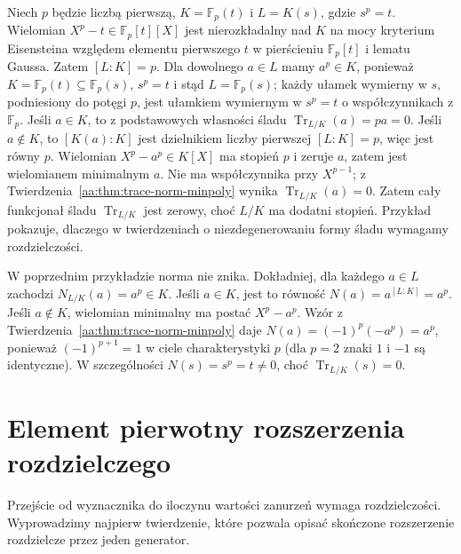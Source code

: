 \begin{przyklad}
\label{aa:ex:inseparable-trace}
Niech $p$ będzie liczbą pierwszą,
$K=\mathbb F_p(t)$ i $L=K(s)$, gdzie $s^p=t$.
Wielomian $X^p-t\in\mathbb F_p[t][X]$ jest
nierozkładalny nad $K$ na mocy kryterium Eisensteina
względem elementu pierwszego $t$ w pierścieniu
$\mathbb F_p[t]$ i lematu Gaussa.
Zatem $[L:K]=p$.
Dla dowolnego $a\in L$ mamy $a^p\in K$,
ponieważ $K=\mathbb F_p(t)\subseteq\mathbb F_p(s)$,
$s^p=t$ i stąd $L=\mathbb F_p(s)$;
każdy ułamek wymierny w $s$, podniesiony do potęgi $p$,
jest ułamkiem wymiernym w $s^p=t$ o współczynnikach
z $\mathbb F_p$.
Jeśli $a\in K$, to z podstawowych własności śladu
$\operatorname{Tr}_{L/K}(a)=pa=0$.
Jeśli $a\notin K$, to $[K(a):K]$ jest dzielnikiem
liczby pierwszej $[L:K]=p$, więc jest równy $p$.
Wielomian $X^p-a^p\in K[X]$ ma stopień $p$
i zeruje $a$, zatem jest wielomianem minimalnym $a$.
Nie ma współczynnika przy $X^{p-1}$;
z Twierdzenia~\ref{aa:thm:trace-norm-minpoly}
wynika $\operatorname{Tr}_{L/K}(a)=0$.
Zatem cały funkcjonał śladu $\operatorname{Tr}_{L/K}$
jest zerowy, choć $L/K$ ma dodatni stopień.
Przykład pokazuje, dlaczego w twierdzeniach o
niezdegenerowaniu formy śladu wymagamy rozdzielczości.
\end{przyklad}

\begin{uwaga}
\label{aa:uw:pure-inseparable-norm}
W poprzednim przykładzie norma nie znika. Dokładniej,
dla każdego $a\in L$ zachodzi $N_{L/K}(a)=a^p\in K$.
Jeśli $a\in K$, jest to równość $N(a)=a^{[L:K]}=a^p$.
Jeśli $a\notin K$, wielomian minimalny ma postać $X^p-a^p$.
Wzór z Twierdzenia~\ref{aa:thm:trace-norm-minpoly} daje
$N(a)=(-1)^p(-a^p)=a^p$, ponieważ
$(-1)^{p+1}=1$ w ciele charakterystyki $p$
(dla $p=2$ znaki $1$ i $-1$ są identyczne).
W szczególności $N(s)=s^p=t\ne0$, choć
$\operatorname{Tr}_{L/K}(s)=0$.
\end{uwaga}

\section{Element pierwotny rozszerzenia rozdzielczego}
Przejście od wyznacznika do iloczynu wartości zanurzeń
wymaga rozdzielczości. Wyprowadzimy najpierw twierdzenie,
które pozwala opisać skończone rozszerzenie rozdzielcze
przez jeden generator.

